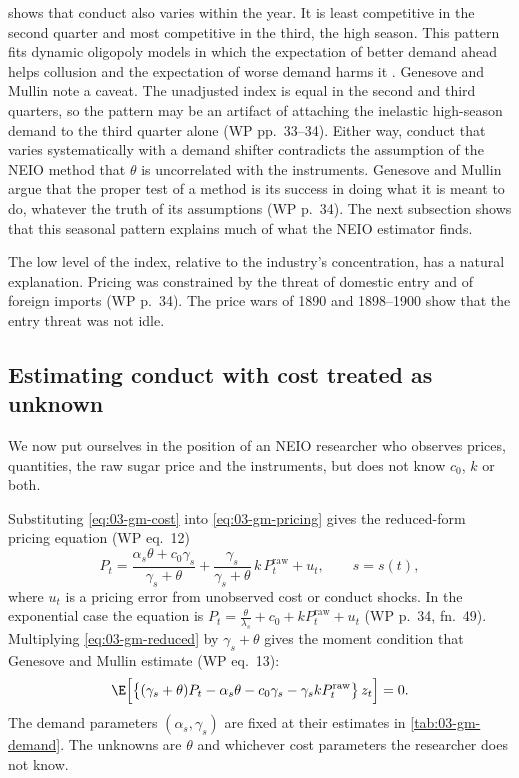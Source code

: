  shows that conduct also varies within the year. It is least competitive in the
second quarter and most competitive in the third, the high season. This pattern fits dynamic oligopoly models
in which the expectation of better demand ahead helps collusion and the expectation of worse demand harms it
\citep{RotembergSaloner1986,HaltiwangerHarrington1991}. Genesove and Mullin note a caveat. The unadjusted
index is equal in the second and third quarters, so the pattern may be an artifact of attaching the
inelastic high-season demand to the third quarter alone (WP pp.~33--34). Either way, conduct that varies
systematically with a demand shifter contradicts the assumption of the NEIO method that $\theta$ is
uncorrelated with the instruments. Genesove and Mullin argue that the proper test of a method is its success in
doing what it is meant to do, whatever the truth of its assumptions (WP p.~34). The next subsection shows that this
seasonal pattern explains much of what the NEIO estimator finds.

The low level of the index, relative to the industry's concentration, has a natural explanation. Pricing was
constrained by the threat of domestic entry and of foreign imports (WP p.~34). The price wars of 1890 and
1898--1900 show that the entry threat was not idle.

\subsection{Estimating conduct with cost treated as unknown}\label{sec:03-sugar-neio}

We now put ourselves in the position of an NEIO researcher who observes prices, quantities, the raw sugar
price and the instruments, but does not know $c_0$, $k$ or both.

Substituting \eqref{eq:03-gm-cost} into \eqref{eq:03-gm-pricing} gives the reduced-form pricing equation
(WP eq.~12)
\begin{equation}\label{eq:03-gm-reduced}
P_t = \frac{\alpha_{s}\theta + c_0\gamma_{s}}{\gamma_{s} + \theta}
 + \frac{\gamma_{s}}{\gamma_{s} + \theta}\,k\,P^{\mathrm{raw}}_t + u_t ,
\qquad s = s(t),
\end{equation}
where $u_t$ is a pricing error from unobserved cost or conduct shocks. In the exponential case the equation
is $P_t = \frac{\theta}{\lambda_s} + c_0 + kP^{\mathrm{raw}}_t + u_t$ (WP p.~34, fn.~49). Multiplying
\eqref{eq:03-gm-reduced} by $\gamma_s + \theta$ gives the moment condition that Genesove and Mullin estimate
(WP eq.~13):
\begin{equation}\label{eq:03-gm-moment}
\E\Big[\big\{(\gamma_s + \theta)P_t - \alpha_s\theta - c_0\gamma_s - \gamma_s k P^{\mathrm{raw}}_t\big\}\,z_t\Big]
= 0 .
\end{equation}
The demand parameters $(\alpha_s, \gamma_s)$ are fixed at their estimates in \cref{tab:03-gm-demand}. The
unknowns are $\theta$ and whichever cost parameters the researcher does not know.

